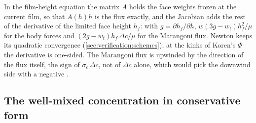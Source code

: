 In the film-height equation the matrix $A$ holds the face weights frozen at
the current film, so that $A(h)h$ is the flux exactly, and the Jacobian adds
the rest of the derivative of the limited face height $h_f$: with
$g = \partial h_f/\partial h$, $w(3g - w_t)h_f^2/\mu$ for the body forces and
$(2g - w_t)h_f\,\Delta c/\mu$ for the Marangoni flux. Newton keeps its
quadratic convergence (\cref{sec:verification:schemes}); at the kinks of
Koren's $\Phi$ the derivative is one-sided. The Marangoni flux is upwinded by
the direction of the flux itself, the sign of $\sigma_c\,\Delta c$, not of
$\Delta c$ alone, which would pick the downwind side with a negative
.

\subsection{The well-mixed concentration in conservative form}
\label{sec:disc:wm-conservative}

